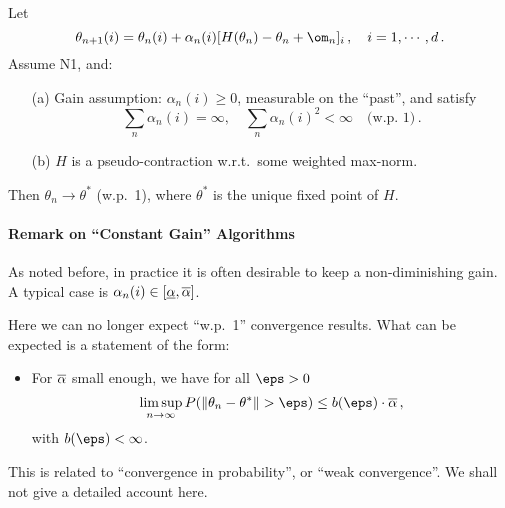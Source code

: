 \begin{theorem}[Prop. 4.4. in B.\&T.]\label{thm:SA_2}
Let
$$
\theta_{n+1}(i) = \theta_n(i) + \alpha_n (i)  [H(\theta_n) - \theta_n +
\om_n]_i\,, \quad i=1, \cdots, d\,.
$$
Assume N1, and:
\begin{itemize}
\item[(a)]
Gain assumption: $\alpha_n(i) \ge 0$, measurable on the ``past'', and satisfy
$$
\sum_n \alpha_n(i) = \infty, \quad \sum_n \alpha_n(i)^2 < \infty \quad
\text{(w.p. 1)}\,.
$$
\item[(b)]
$H$ is a pseudo-contraction w.r.t.\ some weighted max-norm.
\end{itemize}
Then $\theta_n \to \theta^*$ (w.p.\  1), where $\theta^*$ is the unique fixed point
of $H$.
\end{theorem}



\paragraph{Remark on ``Constant Gain'' Algorithms}

As noted before, in practice it is often desirable to keep a non-diminishing
gain.
A typical case is $ \alpha_n(i)\in [\underline\alpha, \overline{\alpha}]$.

Here we can no longer expect ``w.p.\   1'' convergence results.  What can be
expected is a statement of the form:
\begin{itemize}
\item
For $\overline\alpha$ small enough, we have for all $\eps > 0$
$$
\limsupn P (\|\theta_n - \theta^* \| > \eps) \le b(\eps) \cdot
\oo\alpha\,,
$$
with $b(\eps) < \infty$.
\end{itemize}

This is related to ``convergence in probability'', or ``weak convergence''.
We shall not give a detailed account here.

